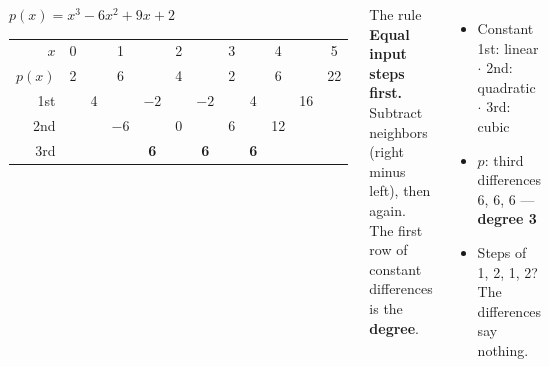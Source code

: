 \documentclass[aspectratio=169, 11pt]{beamer}
\begin{document}
\begin{frame}[t, plain]

  \begin{columns}[T]
      \begin{center}
      $p(x) = x^3 - 6x^2 + 9x + 2$\par\medskip
      {\small
      \renewcommand{\arraystretch}{1.25}
      \setlength{\tabcolsep}{3pt}
      \begin{tabular}{r|*{11}{c}}
      $x$    & 0 &   & 1 &    & 2 &    & 3 &   & 4 &    & 5  \\
      $p(x)$ & 2 &   & 6 &    & 4 &    & 2 &   & 6 &    & 22 \\ \hline
      1st    &   & 4 &   & $-2$ &   & $-2$ &   & 4 &   & 16 &    \\
      2nd    &   &   & $-6$ &  & 0 &    & 6 &   & 12 &   &    \\
      3rd    &   &   &   & \textbf{6}  &   & \textbf{6}  &   & \textbf{6} &   &    &    \\
      \end{tabular}}
      \end{center}

      \begin{block}{The rule}
        \textbf{Equal input steps first.} Subtract neighbors (right minus left), then again.
        The first row of constant differences is the \textbf{degree}.
      \end{block}

      \medskip
      \begin{itemize}\setlength{\itemsep}{4pt}
        \item Constant 1st: linear $\cdot$ 2nd: quadratic $\cdot$ 3rd: cubic
        \item $p$: third differences 6, 6, 6 --- \textbf{degree 3}
        \item Steps of 1, 2, 1, 2? The differences say nothing.
      \end{itemize}
  \end{columns}
\end{frame}
\end{document}
